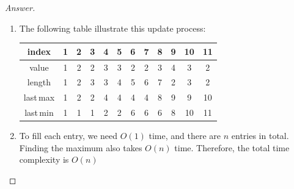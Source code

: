 \documentclass{article}
\theoremstyle{plain}
\newenvironment{answer}[1][Answer]
    {\begin{proof}[#1]{$ $}\renewcommand\qedsymbol{$\vartriangle$}}
    {\end{proof}}
\begin{document}
\begin{answer}
\begin{enumerate}
\begin{enumerate}
\begin{equation*}
\begin{aligned}
\begin{cases}
                        i &\text{ if } a_i > a_{DP[i-1][3]} \text { and } a_i \neq a_{i-1}\\
                        DP[i-1][3]&\text{ if } a_i < a_{DP[i-1][3]}
                    \end{cases} \\
                    DP[i][3] &=
                    \begin{cases}
                        DP[i-1][3] &\text{ if } a_i = a_{DP[i-1][2]} \text{ or } (a_i < a_{DP[i-1][2]} \text{ and } a_i = a_{i-1})\\
                        i &\text{ if } a_i < a_{DP[i-1][2]} \text { and } a_i \neq a_{i-1}\\
                        DP[i-1][2]&\text{ if } a_i > a_{DP[i-1][2]}
                    \end{cases} \\
                \end{aligned}
            \end{equation*}
            Finally, we return $max(DP[i][1])$ in the table.
            \item
            The following table illustrate this update process:
            \begin{center}
            \begin{tabular}{ |c|c|c|c|c|c|c|c|c|c|c|c| }
                 \hline
                 index & 1 & 2 & 3 & 4 & 5 & 6 & 7 & 8 & 9 & 10 & 11 \\
                 \hline
                 value & 1 & 2 & 2 & 3 & 3 & 2 & 2 & 3 & 4 & 3 & 2 \\
                 \hline
                 length & 1 & 2 & 3 & 3 & 4 & 5 & 6 & 7 & 2 & 3 & 2 \\
                 last\,max & 1 & 2 & 2 & 4 & 4 & 4 & 4 & 8 & 9 & 9 & 10 \\
                 last\,min & 1 & 1 & 1 & 2 & 2 & 6 & 6 & 6 & 8 & 10 & 11 \\
                 \hline
            \end{tabular}
            \end{center}
            \item
            To fill each entry, we need $O(1)$ time, and there are $n$ entries in total. Finding the maximum also takes $O(n)$ time. Therefore, the total time complexity is $O(n)$
        \end{enumerate}
    \end{enumerate}
\end{answer}
\end{document}

